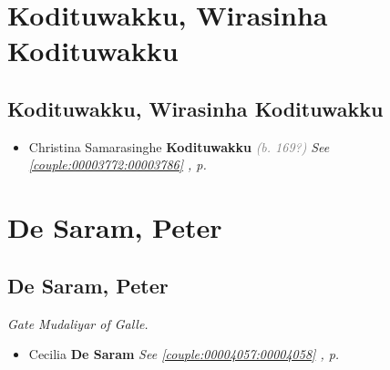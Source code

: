 \documentclass[10pt, openany]{book}
\begin{document}
\part{Kodituwakku, Wirasinha Kodituwakku}
\chapter{Kodituwakku, Wirasinha Kodituwakku}
\label{00003787}
\textcolor{slmaroon}{\textit{}}
\begin{itemize}
\item{Christina Samarasinghe \textbf{Kodituwakku} \textcolor{gray}{\textit{(b. 169?)}} \textcolor{slteal}{\textit{See  \autoref{couple:00003772:00003786} \textit{, p. \pageref{couple:00003772:00003786} }}}}
\end{itemize}
  
\part{De Saram, Peter}
\chapter{De Saram, Peter}
\label{00004214}
\textcolor{slmaroon}{\textit{Gate Mudaliyar of Galle.}}
\begin{itemize}
\item{Cecilia \textbf{De Saram} \textcolor{slorange}{\textit{}} \textcolor{slteal}{\textit{See  \autoref{couple:00004057:00004058} \textit{, p. \pageref{couple:00004057:00004058} }}}}
\end{itemize}
  
\printindex
\end{document}
